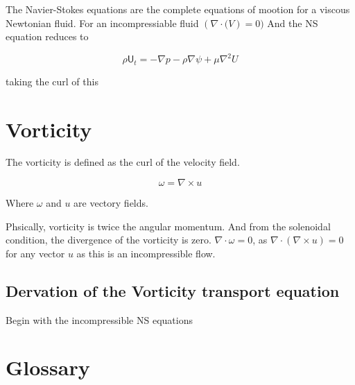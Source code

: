\documentclass[a4paper]{article}
\newcommand*{\pd}[3][]{\ensuremath{\frac{\partial^{#1} #2}{\partial #3}}}
\begin{document}
\newpage
The Navier-Stokes equations are the complete equations of mootion for a viscous Newtonian fluid. For an incompressiable fluid $(\nabla \cdot \mathbf(V) = 0)$
And the NS equation reduces to 

\begin{equation}
\rho \mathsf{U}_{t} = - \nabla p - \rho \nabla \psi + \mu \nabla^{2} U
\end{equation}

taking the curl of this 

\section{Vorticity}

The vorticity is defined as the curl of the velocity field.

\begin{equation}
\omega = \nabla \times u
\end{equation}

Where $\omega$ and $u$ are vectory fields.

Phsically, vorticity is twice the angular momentum. And from the solenoidal condition, the divergence of the vorticity is zero. $\nabla \cdot \omega = 0$, as $\nabla \cdot (\nabla \times u) = 0$ for any vector $u$ as this is an incompressible flow.

\subsection{Dervation of the Vorticity transport equation}

Begin with the incompressible NS equations




\newpage
\section{Glossary}
\end{document}
